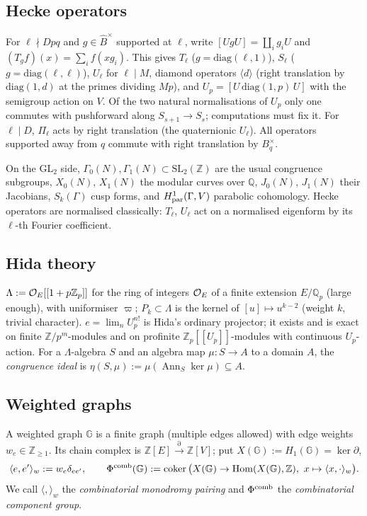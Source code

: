 \documentclass[11pt]{amsart}
\theoremstyle{plain}
\theoremstyle{definition}
\theoremstyle{remark}
\newcommand{\Q}{\mathbb{Q}}\newcommand{\Z}{\mathbb{Z}}\newcommand{\R}{\mathbb{R}}\newcommand{\C}{\mathbb{C}}
\newcommand{\GL}{\mathrm{GL}}\newcommand{\SL}{\mathrm{SL}}\newcommand{\PGL}{\mathrm{PGL}}
\newcommand{\G}{\mathbb{G}}\newcommand{\Iw}{\mathrm{Iw}}\newcommand{\Hb}{\mathfrak{H}}
\DeclareMathOperator{\Hom}{Hom}\DeclareMathOperator{\coker}{coker}\DeclareMathOperator{\End}{End}
\DeclareMathOperator{\Ann}{Ann}\DeclareMathOperator{\rk}{rk}\DeclareMathOperator{\Stab}{Stab}
\begin{document}
\subsection{Hecke operators}
For $\ell\nmid Dpq$ and $g\in\hat B^\times$ supported at $\ell$, write $[UgU]=\coprod_ig_iU$ and $(T_gf)(x)=\sum_if(xg_i)$.
This gives $T_\ell$ ($g=\mathrm{diag}(\ell,1)$), $S_\ell$ ($g=\mathrm{diag}(\ell,\ell)$), $U_\ell$ for $\ell\mid M$, diamond operators $\langle d\rangle$ (right translation by $\mathrm{diag}(1,d)$ at the primes dividing $Mp$), and $U_p=[U\,\mathrm{diag}(1,p)\,U]$ with the semigroup action on $V$.
Of the two natural normalisations of $U_p$ only one commutes with pushforward along $S_{s+1}\to S_s$; computations must fix it.
For $\ell\mid D$, $\Pi_\ell$ acts by right translation (the quaternionic $U_\ell$).
All operators supported away from $q$ commute with right translation by $B_q^\times$.

On the $\GL_2$ side, $\Gamma_0(N),\Gamma_1(N)\subset\SL_2(\Z)$ are the usual congruence subgroups, $X_0(N)$, $X_1(N)$ the modular curves over $\Q$, $J_0(N)$, $J_1(N)$ their Jacobians, $S_k(\Gamma)$ cusp forms, and $H^1_{\rm par}(\Gamma,V)$ parabolic cohomology. Hecke operators are normalised classically: $T_\ell$, $U_\ell$ act on a normalised eigenform by its $\ell$-th Fourier coefficient.

\subsection{Hida theory}
$\Lambda:=\cO_E[[1+p\Z_p]]$ for the ring of integers $\mathcal{O}_E$ of a finite extension $E/\Q_p$ (large enough), with uniformiser $\varpi$; $P_k\subset\Lambda$ is the kernel of $[u]\mapsto u^{k-2}$ (weight $k$, trivial character).
$e=\lim_nU_p^{n!}$ is Hida's ordinary projector; it exists and is exact on finite $\Z/p^m$-modules and on profinite $\Z_p[[U_p]]$-modules with continuous $U_p$-action.
For a $\Lambda$-algebra $S$ and an algebra map $\mu:S\to A$ to a domain $A$, the \emph{congruence ideal} is $\eta(S,\mu):=\mu(\Ann_S\ker\mu)\subseteq A$.

\subsection{Weighted graphs}
A weighted graph $\G$ is a finite graph (multiple edges allowed) with edge weights $w_e\in\Z_{\ge1}$. Its chain complex is $\Z[E]\xrightarrow{\partial}\Z[V]$; put $X(\G):=H_1(\G)=\ker\partial$,
\[\langle e,e'\rangle_w:=w_e\delta_{ee'},\qquad \Phi^{\rm comb}(\G):=\coker\big(X(\G)\to\Hom(X(\G),\Z),\ x\mapsto\langle x,\cdot\rangle_w\big).\]
We call $\langle,\rangle_w$ the \emph{combinatorial monodromy pairing} and $\Phi^{\rm comb}$ the \emph{combinatorial component group}.
\end{document}
